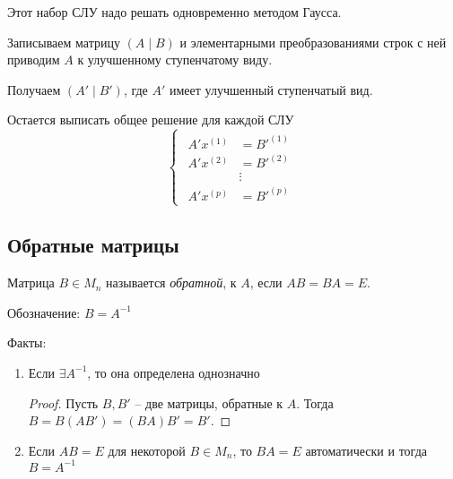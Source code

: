 Этот набор СЛУ надо решать одновременно методом Гаусса.

Записываем матрицу $(A \mid B)$ и элементарными преобразованиями строк с ней приводим $A$ к улучшенному ступенчатому виду.

Получаем $(A' \mid B')$, где $A'$ имеет улучшенный ступенчатый вид.

Остается выписать общее решение для каждой СЛУ
\begin{equation*}
    \begin{cases}
        \begin{aligned}
            A' x^{(1)} &= B'^{(1)} \\
            A' x^{(2)} &= B'^{(2)} \\
            &\vdots \\
            A' x^{(p)} &= B'^{(p)}
        \end{aligned}
    \end{cases}
\end{equation*}


\subsection{Обратные матрицы}

\begin{definition}
    Матрица $B \in M_n$ называется \textit{обратной}, к $A$, если $AB = BA = E$.

    Обозначение: $B = A^{-1}$
\end{definition}



Факты:
\begin{enumerate}
\item Если $\exists A^{-1}$, то она определена однозначно

    \begin{proof}
        Пусть $B, B'$ -- две матрицы, обратные к $A$. Тогда $B = B(AB') = (BA)B' = B'$.
    \end{proof}

\item Если $AB = E$ для некоторой $B \in M_n$, то $BA = E$ автоматически и тогда $B = A^{-1}$

    \begin{comment}
        Доказывается на Лекции 7 %
    \end{comment}
\end{enumerate}

